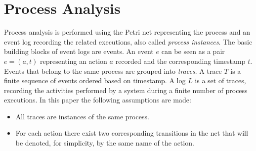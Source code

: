 \documentclass{llncs}
\begin{document}
\section{Process Analysis}\label{Background}
Process analysis is performed using the Petri net representing the process and an event log recording the related executions, also called \emph{process instances}. The basic building blocks of event logs are events. An event $e$ can be seen as a pair $e = (a,t)$ representing an action $a$ recorded and the corresponding timestamp $t$.  Events that belong to the same process are grouped into {\itshape traces}. A trace $T$ is a finite sequence of events ordered based on timestamp. A log $L$ is a set of traces, recording the activities performed by a system during a finite number of process executions.  In this paper the following assumptions are made:
\begin{itemize}
\item All traces are instances of the same process.
\item For each action there exist two corresponding transitions in the net that will be denoted, for simplicity, by the same name of the action.
\end{itemize}
\end{document}
